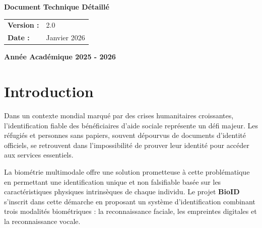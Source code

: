 \documentclass[12pt,a4paper]{report}
\begin{document}
\begin{titlepage}
    \vspace{1.5cm}
    
    \begin{tcolorbox}[colback=gray!5,colframe=gray!50,width=0.6\textwidth]
        \centering
        \textbf{Document Technique Détaillé}\\[0.2cm]
        \begin{tabular}{ll}
            \textbf{Version :} & 2.0 \\
            \textbf{Date :} & Janvier 2026 \\
        \end{tabular}
    \end{tcolorbox}
    
    \vfill
    
    {\large\textbf{Année Académique 2025 - 2026}\par}
\end{titlepage}

\tableofcontents
\newpage

\listoffigures
\listoftables
\newpage

\chapter*{Introduction}

Dans un contexte mondial marqué par des crises humanitaires croissantes, l'identification fiable des bénéficiaires d'aide sociale représente un défi majeur. Les réfugiés et personnes sans papiers, souvent dépourvus de documents d'identité officiels, se retrouvent dans l'impossibilité de prouver leur identité pour accéder aux services essentiels.

La biométrie multimodale offre une solution prometteuse à cette problématique en permettant une identification unique et non falsifiable basée sur les caractéristiques physiques intrinsèques de chaque individu. Le projet \textbf{BioID} s'inscrit dans cette démarche en proposant un système d'identification combinant trois modalités biométriques : la reconnaissance faciale, les empreintes digitales et la reconnaissance vocale.
\end{document}
